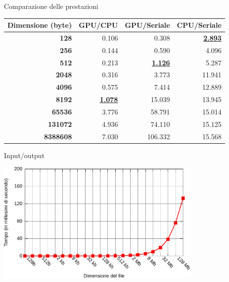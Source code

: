 \documentclass[11pt,xcolor=dvipsnames]{beamer}
\begin{document}
\begin{frame}{Comparazione delle prestazioni}
\begin{center}
\begin{tabular}{|r||r|r|r|}
\hline
\textbf{Dimensione (byte)} & \textbf{GPU/CPU} & \textbf{GPU/Seriale} & \textbf{CPU/Seriale} \\
\hline
\hline
\textbf{128} & 0.106 & 0.308 & \textcolor{OliveGreen}{\textbf{\underline{2.893}}} \\
\hline
\textbf{256} & 0.144 & 0.590 & 4.096 \\
\hline
\textbf{512} & 0.213 & \textcolor{OliveGreen}{\textbf{\underline{1.126}}} & 5.287 \\
\hline
\textbf{2048} & 0.316 & 3.773 & 11.941 \\
\hline
\textbf{4096} & 0.575 & 7.414 & 12.889 \\
\hline
\textbf{8192} & \textcolor{OliveGreen}{\textbf{\underline{1.078}}} & 15.039 & 13.945 \\
\hline
\textbf{65536} & 3.776 & 58.791 & 15.014 \\
\hline
\textbf{131072} & 4.936 & 74.110 & 15.125 \\
\hline
\textbf{8388608} & 7.030 & 106.332 & 15.568 \\
\hline
\end{tabular}
\end{center}
\end{frame}

\begin{frame}{Input/output}
\vspace{7mm}
\begin{center}
\includegraphics[width=10cm]{img/test-write-gpu.pdf}
\end{center}
\end{frame}
\end{document}
